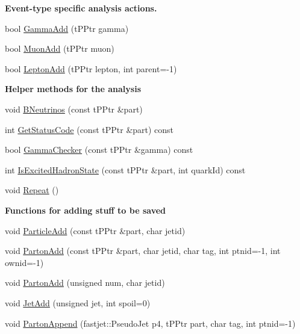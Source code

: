 \begin{Indent}{\bf Event-\/type specific analysis actions.}\par
\begin{DoxyCompactItemize}
\item 
bool \hyperlink{class_herwig_1_1_herwig_tree_a55907713e973e992e7156a76852843b1}{Gamma\+Add} (t\+P\+Ptr gamma)
\item 
bool \hyperlink{class_herwig_1_1_herwig_tree_a1d5bb682934cefecc178353febce65fc}{Muon\+Add} (t\+P\+Ptr muon)
\item 
bool \hyperlink{class_herwig_1_1_herwig_tree_a16313dcbb3bbdd10712e175688e76786}{Lepton\+Add} (t\+P\+Ptr lepton, int parent=-\/1)
\end{DoxyCompactItemize}
\end{Indent}
\begin{Indent}{\bf Helper methods for the analysis}\par
\begin{DoxyCompactItemize}
\item 
void \hyperlink{class_herwig_1_1_herwig_tree_aff2fb52aa58050f06ef3e4348dc212b5}{B\+Neutrinos} (const t\+P\+Ptr \&part)
\item 
int \hyperlink{class_herwig_1_1_herwig_tree_a53035783c31d12776ea6410765fbc82c}{Get\+Status\+Code} (const t\+P\+Ptr \&part) const 
\item 
bool \hyperlink{class_herwig_1_1_herwig_tree_a4bbe10f94b263debf418806437eb12c7}{Gamma\+Checker} (const t\+P\+Ptr \&gamma) const 
\item 
int \hyperlink{class_herwig_1_1_herwig_tree_a857bd97b8e91ebef6e7c82b0cc3117b0}{Is\+Excited\+Hadron\+State} (const t\+P\+Ptr \&part, int quark\+Id) const 
\item 
void \hyperlink{class_herwig_1_1_herwig_tree_a227e5340755c44ba4cf624db61ca1ca1}{Repeat} ()
\end{DoxyCompactItemize}
\end{Indent}
\begin{Indent}{\bf Functions for adding stuff to be saved}\par
\begin{DoxyCompactItemize}
\item 
void \hyperlink{class_herwig_1_1_herwig_tree_a5d32e316c3369a0b9832689c93c4def6}{Particle\+Add} (const t\+P\+Ptr \&part, char jetid)
\item 
void \hyperlink{class_herwig_1_1_herwig_tree_ae03124197c64e55ae4ff6b63b8b15065}{Parton\+Add} (const t\+P\+Ptr \&part, char jetid, char tag, int ptnid=-\/1, int ownid=-\/1)
\item 
void \hyperlink{class_herwig_1_1_herwig_tree_a4aa2bfe3825370d30304afee49896c7a}{Parton\+Add} (unsigned num, char jetid)
\item 
void \hyperlink{class_herwig_1_1_herwig_tree_a0487de1b58e25fd5ca561ee4304256b3}{Jet\+Add} (unsigned jet, int spoil=0)
\item 
void \hyperlink{class_herwig_1_1_herwig_tree_a6a6b0cb9f7b1870cc55895f182b974c1}{Parton\+Append} (fastjet\+::\+Pseudo\+Jet p4, t\+P\+Ptr part, char tag, int ptnid=-\/1)
\end{DoxyCompactItemize}
\end{Indent}
